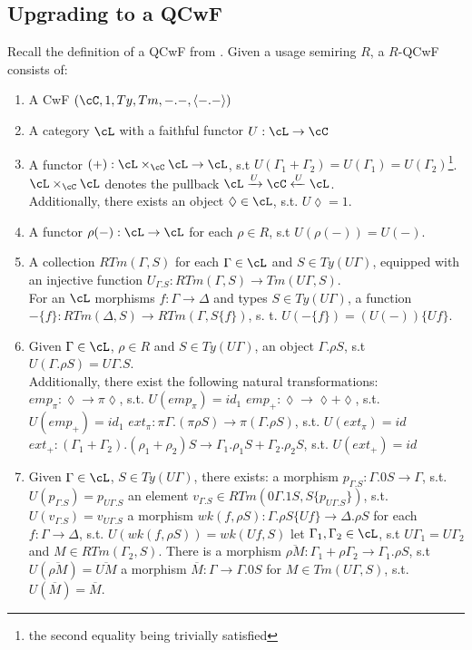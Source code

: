 \documentclass[12pt,a4paper]{article}
\begin{document}
\subsection*{Upgrading to a QCwF}
Recall the definition of a QCwF from \cite{fill}.
Given a usage semiring $R$, a $R$-QCwF consists of:
\begin{enumerate}[noitemsep]
  \item A CwF $(\cC, 1, Ty, Tm, -.-, \langle-.-\rangle)$
  
  \item A category $\cL$ with a faithful functor $U : \cL \to \cC$
  
  \item A functor $(+) : \cL \times_\cC \cL \to \cL$, s.t $U(\Gamma_1 + \Gamma_2) = U(\Gamma_1) = U(\Gamma_2)$\footnote{the second equality being trivially satisfied}. $\cL \times_\cC \cL$ denotes the pullback $\cL \xrightarrow{U} \cC \xleftarrow{U} \cL$.\\
  Additionally, there exists an object $\lozenge \in \cL$, s.t. $U\lozenge = 1$.
  
  \item A functor $\rho(-): \cL \to \cL$ for each $\rho \in R$, s.t $U(\rho(-)) = U(-)$.
  
  \item A collection $RTm(\Gamma, S)$ for each $\Gamma \in \cL$ and $S \in Ty(U\Gamma)$, equipped with an injective function $U_{\Gamma.S} : RTm(\Gamma, S) \to Tm(U\Gamma, S)$.\\
  For an $\cL$ morphisms $f: \Gamma \to \Delta$ and types $S \in Ty(U\Gamma)$, a function $-\{f\} : RTm(\Delta, S) \to RTm(\Gamma, S\{f\})$, s. t. $U(-\{f\}) = (U(-))\{Uf\}$.
         
  \item Given $\Gamma \in \cL$, $\rho \in R$ and $S \in Ty(U\Gamma)$, an object $\Gamma. \rho S$, s.t $U(\Gamma. \rho S) = U\Gamma.S$.\\
  Additionally, there exist the following natural transformations:
  \subitem $emp_\pi : \lozenge \to \pi\lozenge$, s.t. $U(emp_\pi)=id_1$
  \subitem $emp_+ : \lozenge \to \lozenge + \lozenge$, s.t. $U(emp_+)=id_1$
  \subitem $ext_\pi : \pi\Gamma. (\pi\rho S) \to \pi(\Gamma. \rho S)$, s.t. $U(ext_\pi) = id$ 
  \subitem $ext_+ : (\Gamma_1 + \Gamma_2).(\rho_1 + \rho_2)S \to \Gamma_1.\rho_1 S + \Gamma_2 . \rho_2 S$, s.t.  $U(ext_+) = id$ 
  
  \item Given $\Gamma \in \cL$, $S \in Ty(U\Gamma)$, there exists:
  \subitem a morphism $p_{\Gamma.S} : \Gamma. 0S \to \Gamma$, s.t. $U(p_{\Gamma.S})=p_{U\Gamma.S}$
  \subitem an element $v_{\Gamma.S} \in RTm(0\Gamma.1S, S\{p_{U\Gamma.S}\})$, s.t. $U(v_{\Gamma.S})=v_{U\Gamma.S}$
  \subitem a morphism $wk(f, \rho S) : \Gamma.\rho S\{Uf\} \to \Delta.\rho S$ for each $f : \Gamma \to \Delta$, s.t. $U(wk(f, \rho S))=wk(Uf, S)$
  \subitem let $\Gamma_1, \Gamma_2 \in \cL$, s.t $U\Gamma_1 = U\Gamma_2$ and $M \in RTm(\Gamma_2, S)$. There is a morphism $\overline{\rho M} : \Gamma_1 + \rho \Gamma_2 \to \Gamma_1 . \rho S$, s.t $U(\overline{\rho M})= \overline{UM}$
  \subitem a morphism $\overline{M} : \Gamma \to \Gamma.0S$ for $M \in Tm(U\Gamma, S)$, s.t. $U(\overline{M})=\overline{M}$.
\end{enumerate}
\end{document}
